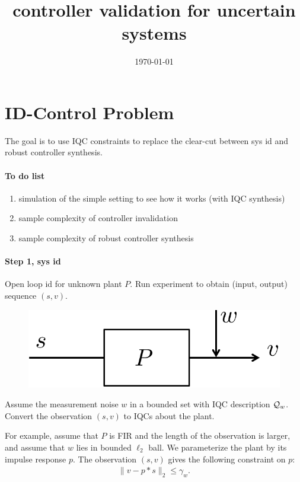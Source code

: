 \documentclass[11pt, onecolumn]{article}
\begin{document}
\title{controller validation for uncertain systems}
\date{\today}



\setcounter{page}{1}


\section{ID-Control Problem}
The goal is to use IQC constraints to replace the clear-cut between sys id and robust controller
synthesis.


\paragraph{To do list }
\begin{enumerate}
\item
  simulation of the simple setting to see how it works (with IQC synthesis)
\item
  sample complexity of controller invalidation
\item
  sample complexity of robust controller synthesis
\end{enumerate}



\paragraph{Step 1, sys id}
Open loop id for unknown plant $P$. Run experiment to obtain (input, output) sequence
$(s,v)$.
\begin{figure}[h!]
  \centering
  \includegraphics[width=.3\linewidth]{sys3.pdf}
\end{figure}

Assume the measurement noise $w$ in a bounded set with IQC description $\mathcal Q_w$. Convert the
observation $(s,v)$ to IQCs about the plant.

For example, assume that $P$ is FIR and the length of the observation is larger, and assume that $w$
lies in bounded $\ell_2$ ball. We parameterize the plant by its impulse response $p$.  The observation
$(s,v)$ gives the following constraint on $p$:
\begin{align*}
  \| v - p*s\|_2\le \gamma_w.
\end{align*}
\end{document}
